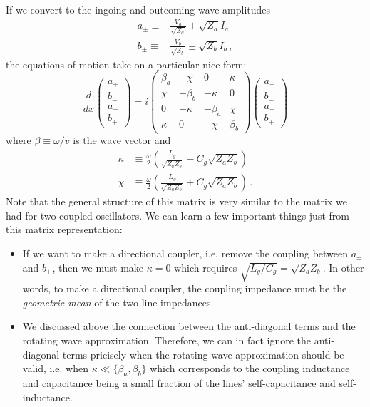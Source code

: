 If we convert to the ingoing and outcoming wave amplitudes
\begin{align}
  a_\pm \equiv& \frac{V_a}{\sqrt{Z_a}} \pm \sqrt{Z_a} I_a \\
  b_\pm \equiv& \frac{V_b}{\sqrt{Z_b}} \pm \sqrt{Z_b} I_b \, ,
\end{align}
the equations of motion take on a particular nice form:
\begin{equation}
  \frac{d}{dx} \left(
    \begin{array}{c}
      a_+ \\ b_- \\ a_- \\ b_+
    \end{array}
  \right)
  =
  i \left(
    \begin{array}{cccc}
      \beta_a & -\chi & 0 & \kappa \\
      \chi & - \beta_b & -\kappa & 0 \\
      0 & -\kappa & -\beta_a & \chi \\
      \kappa & 0 & - \chi & \beta_b
    \end{array}
  \right)
  \left(
    \begin{array}{c}
      a_+ \\ b_- \\ a_- \\ b_+
    \end{array}
  \right)
\end{equation}
where $\beta \equiv \omega / v$ is the wave vector and
\begin{align}
  \kappa &\equiv \frac{\omega}{2} \left( \frac{L_g}{\sqrt{Z_a Z_b}} - C_g \sqrt{Z_a Z_b} \right) \\
  \chi &\equiv \frac{\omega}{2} \left( \frac{L_g}{\sqrt{Z_a Z_b}} + C_g \sqrt{Z_a Z_b} \right) \, .
\end{align}
Note that the general structure of this matrix is very similar to the matrix we had for two coupled oscillators.
We can learn a few important things just from this matrix representation:
\begin{itemize}
    \item If we want to make a directional coupler, i.e. remove the coupling between $a_\pm$ and $b_\pm$, then we must make $\kappa = 0$ which requires $\sqrt{L_g / C_g} = \sqrt{Z_a Z_b}$. In other words, to make a directional coupler, the coupling impedance must be the \emph{geometric mean} of the two line impedances.
    \item We discussed above the connection between the anti-diagonal terms and the rotating wave approximation. Therefore, we can in fact ignore the anti-diagonal terms pricisely when the rotating wave approximation should be valid, i.e. when $\kappa \ll \{\beta_a, \beta_b\}$ which corresponds to the coupling inductance and capacitance being a small fraction of the lines' self-capacitance and self-inductance.
\end{itemize}
